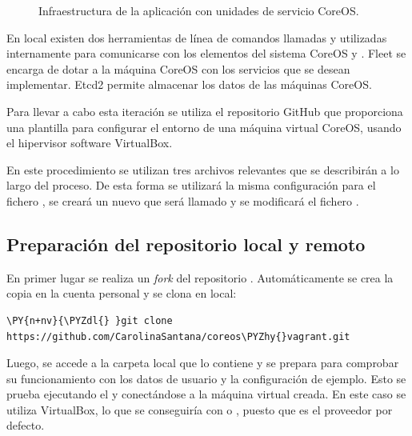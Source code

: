 \begin{figure}[H] 
\centering
{}
\caption{Infraestructura de la aplicación con unidades de servicio CoreOS.\label{fig:coreosdiagram}}
\end{figure}

En local existen dos herramientas de línea de comandos llamadas  y  utilizadas internamente para comunicarse con los elementos del sistema CoreOS  y . Fleet se encarga de dotar a la máquina CoreOS con los servicios que se desean implementar. Etcd2 permite almacenar los datos de las máquinas CoreOS.

Para llevar a cabo esta iteración se utiliza el repositorio GitHub  que proporciona una plantilla  para configurar el entorno de una máquina virtual CoreOS, usando el hipervisor software VirtualBox.

En este procedimiento se utilizan tres archivos relevantes que se describirán a lo largo del proceso. De esta forma se utilizará la misma configuración para el fichero , se creará un nuevo  que será llamado  y se modificará el fichero .

\subsection{Preparación del repositorio local y remoto}

En primer lugar se realiza un \textit{fork} del repositorio . Automáticamente se crea la copia en la cuenta personal y se clona en local:

\begin{framed_shaded}
\begin{Verbatim}[fontsize=\relsize{-2.5},fontseries=b,commandchars=\\\{\}]
\PY{n+nv}{\PYZdl{} }git clone https://github.com/CarolinaSantana/coreos\PYZhy{}vagrant.git 
\end{Verbatim}
\end{framed_shaded}

Luego, se accede a la carpeta local que lo contiene y se prepara para comprobar su funcionamiento con los datos de usuario y la configuración de ejemplo. Esto se prueba ejecutando el  y conectándose a la máquina virtual creada. En este caso se utiliza VirtualBox, lo que se conseguiría con  o , puesto que es el proveedor por defecto. 

